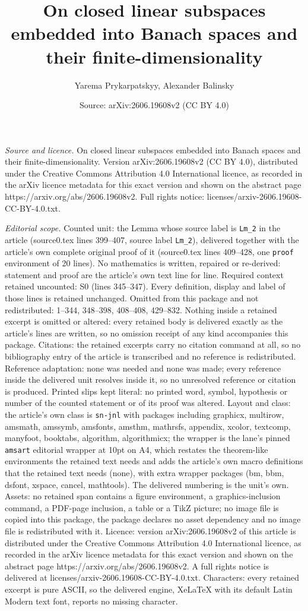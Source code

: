 \documentclass[10pt,a4paper]{amsart}
\title[On closed linear subspaces embedded into Banach spaces and t]{On closed linear subspaces embedded into Banach spaces and their finite-dimensionality}
\author{Yarema Prykarpatskyy, Alexander Balinsky}
\date{Source: arXiv:2606.19608v2 (CC BY 4.0)}
\begin{document}
\maketitle

\noindent\emph{Source and licence.} On closed linear subspaces embedded into Banach spaces and their finite-dimensionality. Version arXiv:2606.19608v2 (CC BY 4.0), distributed under the Creative Commons Attribution 4.0 International licence, as recorded in the arXiv licence metadata for this exact version and shown on the abstract page https://arxiv.org/abs/2606.19608v2. Full rights notice: licenses/arxiv-2606.19608-CC-BY-4.0.txt.\par\smallskip

\noindent\textit{Editorial scope.} Counted unit: the Lemma whose source label is \texttt{Lm\_2} in the article (source0.tex lines 399--407, source label \texttt{Lm\_2}), delivered together with the article's own complete original proof of it (source0.tex lines 409--428, one \texttt{proof} environment of 20 lines). No mathematics is written, repaired or re-derived: statement and proof are the article's own text line for line. Required context retained uncounted: S0 (lines 345--347). Every definition, display and label of those lines is retained unchanged. Omitted from this package and not redistributed: 1--344, 348--398, 408--408, 429--832. Nothing inside a retained excerpt is omitted or altered: every retained body is delivered exactly as the article's lines are written, so no omission receipt of any kind accompanies this package. Citations: the retained excerpts carry no citation command at all, so no bibliography entry of the article is transcribed and no reference is redistributed. Reference adaptation: none was needed and none was made; every reference inside the delivered unit resolves inside it, so no unresolved reference or citation is produced. Printed slips kept literal: no printed word, symbol, hypothesis or number of the counted statement or of its proof was altered. Layout and class: the article's own class is \texttt{sn-jnl} with packages including graphicx, multirow, amsmath, amssymb, amsfonts, amsthm, mathrsfs, appendix, xcolor, textcomp, manyfoot, booktabs, algorithm, algorithmicx; the wrapper is the lane's pinned \texttt{amsart} editorial wrapper at 10pt on A4, which restates the theorem-like environments the retained text needs and adds the article's own macro definitions that the retained text needs (none), with extra wrapper packages (bm, bbm, dsfont, xspace, cancel, mathtools). The delivered numbering is the unit's own. Assets: no retained span contains a figure environment, a graphics-inclusion command, a PDF-page inclusion, a table or a TikZ picture; no image file is copied into this package, the package declares no asset dependency and no image file is redistributed with it. Licence: version arXiv:2606.19608v2 of this article is distributed under the Creative Commons Attribution 4.0 International licence, as recorded in the arXiv licence metadata for this exact version and shown on the abstract page https://arxiv.org/abs/2606.19608v2. A full rights notice is delivered at licenses/arxiv-2606.19608-CC-BY-4.0.txt. Characters: every retained excerpt is pure ASCII, so the delivered engine, XeLaTeX with its default Latin Modern text font, reports no missing character.
\end{document}
